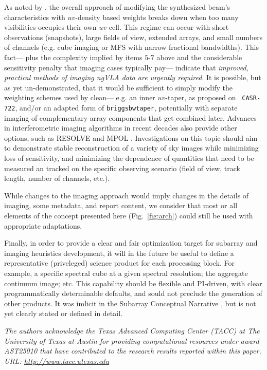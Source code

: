 \documentclass[11pt]{article}
\begin{document}
As noted by \citep{memo78}, the overall approach of modifying the
synthesized beam's characteristics with $uv$-density based weights
breaks down when too many visibilities occupies their own
$uv$-cell. This regime can occur with short observations (snapshots),
large fields of view, extended arrays, and small numbers of channels
(e.g. cube imaging or MFS with narrow fractional bandwidths). This
fact--- plus the complexity implied by items $5$-$7$ above and the
considerable sensitivity penalty that imaging cases typically pay---
indicate that {\it improved, practical methods of imaging ngVLA data
  are urgently required}.  It is possible, but as yet un-demonstrated,
that it would be sufficient to simply modify the weighting schemes
used by clean--- e.g. an inner $uv$-taper, as proposed on {\tt
  CASR-722}, and/or an adapted form of {\tt briggsbwtaper},
potentially with separate imaging of complementary array components
that get combined later. Advances in interferometric imaging
algorithms in recent decades also provide other options, such as
RESOLVE \citep{resolve} and MPOL \citep{mpol}. Investigations on this
topic should aim to demonstrate stable reconstruction of a variety of
sky images while minimizing loss of sensitivity, and minimizing the
dependence of quantities that need to be measured an tracked on the
specific observing scenario (field of view, track length, number of
channels, etc.).

While changes to the imaging approach would imply changes in the
details of imaging, some metadata, and report content, we consider
that most or all elements of the concept presented here
(Fig.~\ref{fig:arch}) could still be used with appropriate
adaptations.

Finally, in order to provide a clear and fair optimization target for
subarray and imaging heuristics development, it will in the future be
useful to define a representative (priveleged) science product for
each processing block. For example, a specific spectral cube at a
given spectral resolution; the aggregate continuum image; etc.  This
capability should be flexible and PI-driven, with clear
programmatically determinable defaults, and sould not preclude the
generation of other products. It was imlicit in the Subarray
Conceptual Narrative \citep{saNarrative}, but is not yet clearly
stated or defined in detail.

{\it The authors acknowledge the Texas Advanced Computing Center
  (TACC) at The University of Texas at Austin for providing
  computational resources under award AST25010 that have contributed
  to the research results reported within this paper. URL:
  \url{http://www.tacc.utexas.edu}}
\end{document}
